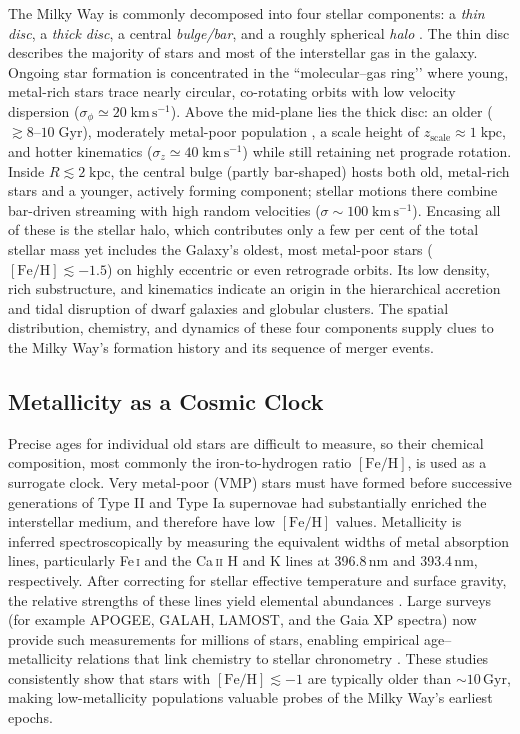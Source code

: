 \documentclass[a4paper,12pt]{article}
\begin{document}
The Milky Way is commonly decomposed into four stellar components: a \emph{thin disc}, 
a \emph{thick disc}, a central \emph{bulge/bar}, and a roughly spherical \emph{halo} 
\citep{BlandHawthorn2016,Helmi2020}.  
The thin disc describes the majority of stars and most of the interstellar gas 
in the galaxy.  Ongoing star formation is concentrated in the “molecular–gas ring’’ where young, 
metal-rich stars trace nearly circular, co-rotating 
orbits with low velocity dispersion ($\sigma_\phi \simeq 20\;\mathrm{km\,s^{-1}}$).  
Above the mid-plane lies the thick disc: an older ($\gtrsim8$–$10\;\mathrm{Gyr}$), 
moderately metal-poor population , a scale 
height of $z_{\mathrm{scale}}\approx1\;\mathrm{kpc}$, and hotter kinematics 
($\sigma_z \simeq 40\;\mathrm{km\,s^{-1}}$) while still retaining net prograde rotation.  
Inside $R\lesssim2\;\mathrm{kpc}$, the central bulge (partly bar-shaped) hosts both 
old, metal-rich stars and a younger, actively forming component; stellar motions 
there combine bar-driven streaming with high random velocities 
($\sigma\sim100\;\mathrm{km\,s^{-1}}$).  
Encasing all of these is the stellar halo, which contributes only a few per cent 
of the total stellar mass yet includes the Galaxy’s oldest, most metal-poor stars 
($[\mathrm{Fe/H}]\lesssim-1.5$) on highly eccentric or even retrograde orbits.  
Its low density, rich substructure, and kinematics indicate an origin in the
 hierarchical accretion and tidal disruption of dwarf galaxies and globular clusters.  
The spatial distribution, chemistry, and dynamics of these four components 
supply clues to the Milky Way’s formation history and its sequence of merger events.


\subsection{Metallicity as a Cosmic Clock}

Precise ages for individual old stars are difficult to measure, so their chemical 
composition, most commonly the iron-to-hydrogen ratio $[\mathrm{Fe/H}]$, is 
used as a surrogate clock.  
Very metal-poor (VMP) stars must have formed before successive generations of Type II 
and Type Ia supernovae had substantially enriched the interstellar medium, and 
therefore have low $[\mathrm{Fe/H}]$ values.  
Metallicity is inferred spectroscopically by measuring the equivalent widths of 
metal absorption lines, particularly Fe\,\textsc{i} and the Ca\,\textsc{ii} H and 
K lines at 396.8\,nm and 393.4\,nm, respectively. After correcting for stellar 
effective temperature and surface gravity, the relative strengths of these lines 
yield elemental abundances \citep{Gray_2005}.
Large surveys (for example APOGEE, GALAH, LAMOST, and the Gaia XP spectra) now 
provide such measurements for millions of stars, enabling empirical age–metallicity 
relations that link chemistry to stellar chronometry 
\citep[e.g.][]{Nordstrom2004,Haywood2013,leung2019deep,Anders2023}.  
These studies consistently show that stars with $[\mathrm{Fe/H}]\lesssim -1$ are 
typically older than $\sim10$\,Gyr, making low-metallicity populations valuable 
probes of the Milky Way’s earliest epochs.
\end{document}
